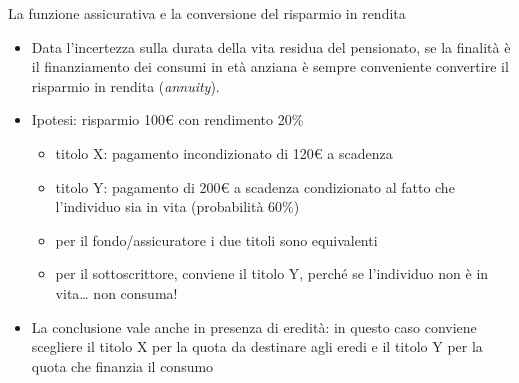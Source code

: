 \documentclass[aspectratio=64,11pt]{beamer}
\begin{document}
\begin{frame}{La funzione assicurativa e la conversione del risparmio in rendita}
\begin{itemize}
\item Data l'incertezza sulla durata della vita residua del pensionato, se la
finalità è il finanziamento dei consumi in età anziana è \alert{sempre}
conveniente convertire il risparmio in rendita (\emph{annuity}).
\item Ipotesi: risparmio 100€ con rendimento 20\%
\begin{itemize}
\item titolo X: pagamento incondizionato di 120€ a scadenza
\item titolo Y: pagamento di 200€ a scadenza condizionato al fatto che
l'individuo sia in vita (probabilità 60\%)
\item per il fondo/assicuratore i due titoli sono equivalenti
\item per il sottoscrittore, conviene il titolo Y, perché se l'individuo non è
in vita\ldots{} non consuma!
\end{itemize}
\item La conclusione vale anche in presenza di eredità: in questo caso conviene
scegliere il titolo X per la quota da destinare agli eredi e il titolo Y per
la quota che finanzia il consumo
\end{itemize}
\end{frame}
\end{document}

